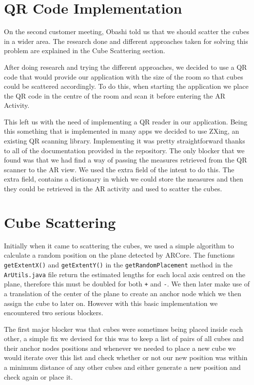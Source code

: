\documentclass{l3proj}
\begin{document}
\section{QR Code Implementation}
On the second customer meeting, Obashi told us that we should scatter the
cubes in a wider area. The research done and different approaches taken
for solving this problem are explained in the Cube Scattering section. %

After doing research and trying the different approaches, we decided to
use a QR code that would provide our application with the size of
the room so that cubes could be scattered accordingly. To do this,
when starting the application we place the QR code in the centre of
the room and scan it before entering the AR Activity.

This left us with the need of implementing a QR reader in our application.
Being this something that is implemented in many apps we decided to use
ZXing\cite{ZXing}, an existing QR scanning library. Implementing it was
pretty straightforward thanks to all of the documentation provided in
the repository. The only blocker that we found was that we had find a
way of passing the measures retrieved from the QR scanner to the AR view.
We used the extra field of the intent to do this. The extra field,
contains a dictionary in which we could store the measures and then
they could be retrieved in the AR activity and used to scatter the
cubes.

\section{Cube Scattering}
Initially when it came to scattering the cubes, we used a simple algorithm to calculate a random position on the plane detected by ARCore. The functions \verb|getExtentX()| and \verb|getExtentY()| in the \verb|getRandomPlacement| method in the \verb|ArUtils.java| file return the estimated lengths for each local axis centred on the plane, therefore this must be doubled for both \verb|+| and \verb|-|. We then later make use of a translation of the center of the plane to create an anchor node which we then assign the cube to later on. However with this basic implementation we encountered two serious blockers.

The first major blocker was that cubes were sometimes being placed inside each other, a simple fix we devised for this was to keep a list of pairs of all cubes and their anchor nodes positions and whenever we needed to place a new cube we would iterate over this list and check whether or not our new position was within a minimum distance of any other cubes and either generate a new position and check again or place it.
\end{document}
